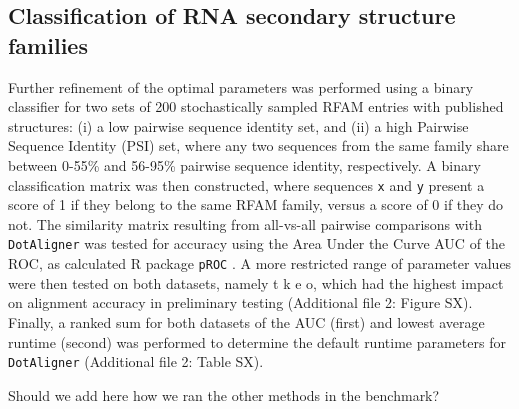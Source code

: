 \documentclass{bmcart}
\newcommand\dotaligner{\texttt{DotAligner}}
\begin{document}
\subsection*{Classification of RNA secondary structure families}

Further refinement of the optimal parameters was performed using a binary classifier for two sets of 
200 stochastically sampled RFAM entries with published structures: 
(i) a low pairwise sequence identity set, and (ii) a high Pairwise Sequence Identity (PSI) set, 
where any two sequences from the same family share between 0-55\% and 56-95\% pairwise sequence identity, respectively. A binary classification matrix was then constructed, where sequences \texttt{x} and \texttt{y}
present a score of 1 if they belong to the same RFAM family, versus a score of 0 if they do not. 
The similarity matrix resulting from all-vs-all pairwise comparisons with \dotaligner{} was tested for 
accuracy using the Area Under the Curve AUC of the ROC, as calculated R package \texttt{pROC} \cite{robin2011proc}. 
A more restricted range of parameter values were then tested on both datasets, {\color{red} namely t k e o, which had the highest impact on alignment accuracy in preliminary testing (Additional file 2: Figure SX)}. Finally, a ranked sum for both datasets of the AUC (first) and lowest average runtime (second) was performed to determine the default runtime parameters for \dotaligner{} {\color{red} (Additional file 2: Table SX)}.

{\color{red} Should we add here how we ran the other methods in the benchmark?}

\end{document}
